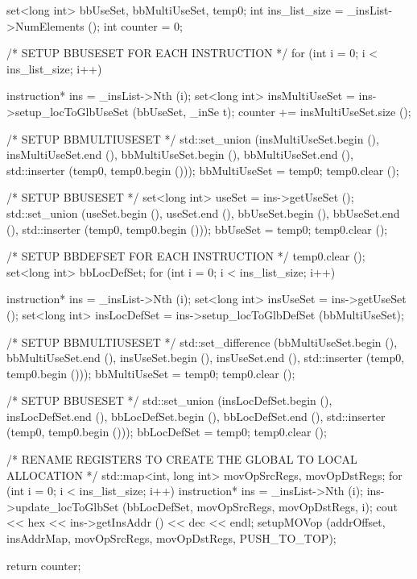 \begin{DoxyCode}
                                                                                 
          {
    set<long int> bbUseSet, bbMultiUseSet, temp0;
    int ins_list_size = _insList->NumElements ();
    int counter = 0;

    /* SETUP BBUSESET FOR EACH INSTRUCTION */
    for  (int i = 0; i < ins_list_size; i++) {
        instruction* ins = _insList->Nth (i);
        set<long int> insMultiUseSet = ins->setup_locToGlbUseSet (bbUseSet, _inSe
      t);
        counter += insMultiUseSet.size ();

        /* SETUP BBMULTIUSESET */
        std::set_union (insMultiUseSet.begin (), insMultiUseSet.end (),
                        bbMultiUseSet.begin (), bbMultiUseSet.end (), 
                        std::inserter (temp0, temp0.begin ()));
        bbMultiUseSet = temp0;
        temp0.clear ();

        /* SETUP BBUSESET */
        set<long int> useSet = ins->getUseSet ();
        std::set_union (useSet.begin (), useSet.end (),
                        bbUseSet.begin (), bbUseSet.end (), 
                        std::inserter (temp0, temp0.begin ()));
        bbUseSet = temp0;
        temp0.clear ();
    }

    /* SETUP BBDEFSET FOR EACH INSTRUCTION */
    temp0.clear ();
    set<long int> bbLocDefSet;
    for  (int i = 0; i < ins_list_size; i++) {
        instruction* ins = _insList->Nth (i);
        set<long int> insUseSet = ins->getUseSet ();
        set<long int> insLocDefSet = ins->setup_locToGlbDefSet (bbMultiUseSet);

        /* SETUP BBMULTIUSESET */
        std::set_difference (bbMultiUseSet.begin (), bbMultiUseSet.end (),
                              insUseSet.begin (), insUseSet.end (), 
                              std::inserter (temp0, temp0.begin ()));
        bbMultiUseSet = temp0;
        temp0.clear ();

        /* SETUP BBUSESET */
        std::set_union (insLocDefSet.begin (), insLocDefSet.end (),
                        bbLocDefSet.begin (), bbLocDefSet.end (), 
                        std::inserter (temp0, temp0.begin ()));
        bbLocDefSet = temp0;
        temp0.clear ();
    }

    /* RENAME REGISTERS TO CREATE THE GLOBAL TO LOCAL ALLOCATION */
    std::map<int, long int> movOpSrcRegs, movOpDstRegs;
    for  (int i = 0; i < ins_list_size; i++) {
        instruction* ins = _insList->Nth (i);
        ins->update_locToGlbSet (bbLocDefSet, movOpSrcRegs, movOpDstRegs, i);
        cout << hex << ins->getInsAddr () << dec << endl;
    }
    setupMOVop (addrOffset, insAddrMap, movOpSrcRegs, movOpDstRegs, PUSH_TO_TOP);
      
    return counter;
}
\end{DoxyCode}


